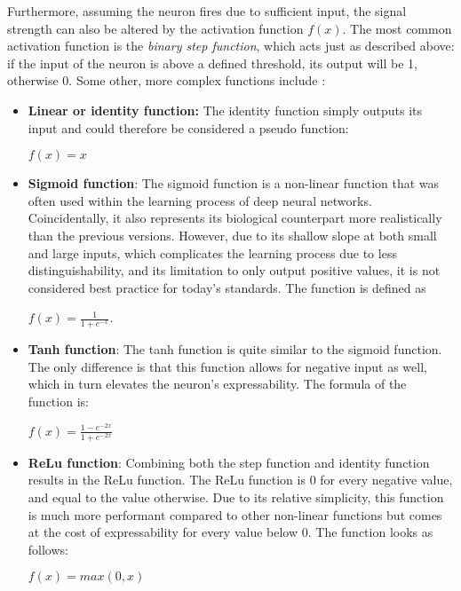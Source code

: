 \documentclass[draft,final]{vutinfth} %
\begin{document}
Furthermore, assuming the neuron fires due to sufficient input, the signal strength can also be altered by the activation function $f(x)$. The most common activation function is the \emph{binary step function}, which acts just as described above: if the input of the neuron is above a defined threshold, its output will be 1, otherwise 0. Some other, more complex functions include \cite{wang2020influence}:
\begin{itemize}
\item \textbf{Linear or identity function:} The identity function simply outputs its input and could therefore be considered a pseudo function: 

\begin{center}
$f(x)=x$
\end{center}

\item \textbf{Sigmoid function}: The sigmoid function is a non-linear function that was often used within the learning process of deep neural networks. Coincidentally, it also represents its biological counterpart more realistically than the previous versions. However, due to its shallow slope at both small and large inputs, which complicates the learning process due to less distinguishability, and its limitation to only output positive values, it is not considered best practice for today's standards. The function is defined as 
\begin{center}
$f(x)=\frac{1}{1+e^{-x}}$.
\end{center}

\item \textbf{Tanh function}: The tanh function is quite similar to the sigmoid function. The only difference is that this function allows for negative input as well, which in turn elevates the neuron's expressability. The formula of the function is:
\begin{center}
$f(x)=\frac{1-e^{-2x}}{1+e^{-2x}}$
\end{center} 

\item \textbf{ReLu function}: Combining both the step function and identity function results in the ReLu function. The ReLu function is 0 for every negative value, and equal to the value otherwise. Due to its relative simplicity, this function is much more performant compared to other non-linear functions but comes at the cost of expressability for every value below 0. The function looks as follows:
\begin{center}
$f(x)=max(0,x)$
\end{center}


\end{itemize}
\end{document}
